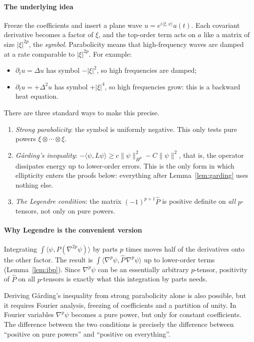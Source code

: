 \documentclass[11pt,reqno]{amsart}
\theoremstyle{definition}
\theoremstyle{remark}
\newcommand{\ip}[2]{\langle #1,#2\rangle}
\newcommand{\norm}[1]{\lVert #1\rVert}
\newcommand{\abs}[1]{\lvert #1\rvert}
\newcommand{\hatP}{\widehat{P}}
\numberwithin{equation}{section}
\begin{document}
\paragraph{The underlying idea} Freeze the coefficients and insert a plane wave
$u=e^{i\ip{\xi}{x}}a(t)$. Each covariant derivative becomes a factor of $\xi$, and the top-order term
acts on $a$ like a matrix of size $\abs\xi^{2p}$, the \emph{symbol}. Parabolicity means that
high-frequency waves are damped at a rate comparable to $\abs\xi^{2p}$. For example:
\begin{itemize}[nosep]
\item $\partial_tu=\Delta u$ has symbol $-\abs\xi^2$, so high frequencies are damped;
\item $\partial_tu=+\Delta^2u$ has symbol $+\abs\xi^4$, so high frequencies grow: this is a backward
  heat equation.
\end{itemize}
There are three standard ways to make this precise.
\begin{enumerate}[label=(\arabic*),nosep]
\item \emph{Strong parabolicity}: the symbol is uniformly negative. This only tests pure powers
  $\xi\otimes\cdots\otimes\xi$.
\item \emph{G\aa rding's inequality}: $-\ip{\psi}{L\psi}\ge c\norm\psi_{H^p}^2-C\norm\psi^2$, that is,
  the operator dissipates energy up to lower-order errors. This is the only form in which ellipticity
  enters the proofs below: everything after Lemma~\ref{lem:garding} uses nothing else.
\item \emph{The Legendre condition}: the matrix $(-1)^{p+1}\hatP$ is positive definite on
  \emph{all} $p$-tensors, not only on pure powers.
\end{enumerate}

\paragraph{Why Legendre is the convenient version} Integrating
$\int\ip{\psi}{P(\nabla^{2p}\psi)}$ by parts $p$ times moves half of the derivatives onto the other
factor. The result is $\int\ip{\nabla^p\psi}{\hatP\,\nabla^p\psi}$ up to lower-order terms
(Lemma~\ref{lem:ibp}). Since $\nabla^p\psi$ can be an essentially arbitrary $p$-tensor, positivity of
$\hatP$ on all $p$-tensors is exactly what this integration by parts needs.

Deriving G\aa rding's inequality from strong parabolicity alone is also possible, but it requires
Fourier analysis, freezing of coefficients and a partition of unity. In Fourier variables
$\nabla^p\psi$ becomes a pure power, but only for constant coefficients. The difference between the
two conditions is precisely the difference between ``positive on pure powers'' and ``positive on
everything''.
\end{document}
